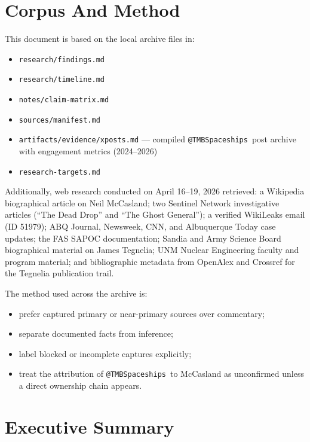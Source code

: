 \documentclass[11pt]{article}
\makeatletter
\newcommand{\account}{\texttt{@TMBSpaceships}}
\makeatother
\begin{document}
\section{Corpus And Method}

This document is based on the local archive files in:

\begin{itemize}
  \item \texttt{research/findings.md}
  \item \texttt{research/timeline.md}
  \item \texttt{notes/claim-matrix.md}
  \item \texttt{sources/manifest.md}
  \item \texttt{artifacts/evidence/xposts.md} — compiled \account\ post archive with engagement metrics (2024--2026)
  \item \texttt{research-targets.md}
\end{itemize}

Additionally, web research conducted on April 16--19, 2026 retrieved: a Wikipedia biographical article on Neil McCasland; two Sentinel Network investigative articles (``The Dead Drop'' and ``The Ghost General''); a verified WikiLeaks email (ID 51979); ABQ Journal, Newsweek, CNN, and Albuquerque Today case updates; the FAS SAPOC documentation; Sandia and Army Science Board biographical material on James Tegnelia; UNM Nuclear Engineering faculty and program material; and bibliographic metadata from OpenAlex and Crossref for the Tegnelia publication trail.

The method used across the archive is:

\begin{itemize}
  \item prefer captured primary or near-primary sources over commentary;
  \item separate documented facts from inference;
  \item label blocked or incomplete captures explicitly;
  \item treat the attribution of \account\ to McCasland as unconfirmed unless a direct ownership chain appears.
\end{itemize}

\section{Executive Summary}
\end{document}
